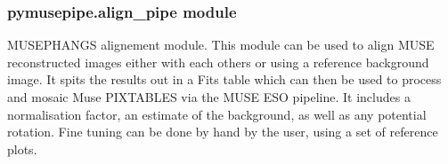 \documentclass[letterpaper,10pt,english]{sphinxmanual}
\begin{document}
\subsubsection{pymusepipe.align\_pipe module}
\label{\detokenize{api/pymusepipe:module-pymusepipe.align_pipe}}\label{\detokenize{api/pymusepipe:pymusepipe-align-pipe-module}}
\sphinxAtStartPar
MUSE\sphinxhyphen{}PHANGS alignement module. This module can be used to align MUSE
reconstructed images either with each others or using a reference background
image. It spits the results out in a Fits table which can then be used
to process and mosaic Muse PIXTABLES via the MUSE ESO pipeline.
It includes a normalisation factor, an estimate of the background,
as well as any potential rotation. Fine tuning
can be done by hand by the user, using a set of reference plots.
\end{document}
